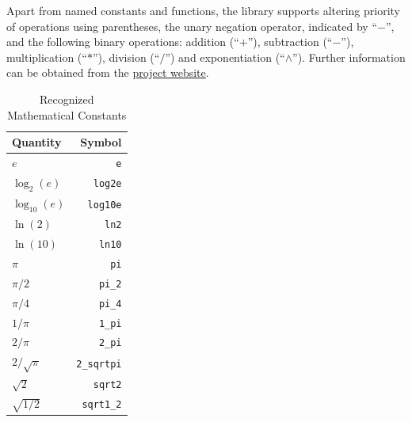 \documentclass{article}
\begin{document}
Apart from named constants and functions, the library supports
altering priority of operations using parentheses, the unary negation operator,
indicated by ``$-$'', and the following binary operations: addition (``$+$''),
subtraction (``$-$''), multiplication (``$\ast$''), division (``$/$'') and
exponentiation (``$\wedge$''). Further information can be obtained from the
\href{https://www.gnu.org/software/libmatheval/}{project website}.

\begin{table}
\begin{center}
\caption{Recognized Mathematical Constants}
\label{tab:constants}
\vspace{1ex}
\begin{tabular}{l|r}
Quantity & Symbol \\
\hline
$e$ & \texttt{e}\\
$\log_2(e)$ & \texttt{log2e} \\
$\log_{10}(e)$ & \texttt{log10e} \\
$\ln(2)$ & \texttt{ln2} \\
$\ln(10)$ & \texttt{ln10}\\
$\pi$ & \texttt{pi}\\
$\pi / 2$ & \texttt{pi\_2}\\
$\pi / 4$ & \texttt{pi\_4}\\
$1 / \pi$ & \texttt{1\_pi}\\
$2 / \pi$ & \texttt{2\_pi}\\
$2 / \sqrt{\pi}$ & \texttt{2\_sqrtpi}\\
$\sqrt{2}$ & \texttt{sqrt2}\\
$\sqrt{1 / 2}$ & \texttt{sqrt1\_2}
\end{tabular}
\end{center}
\end{table}
\end{document}
